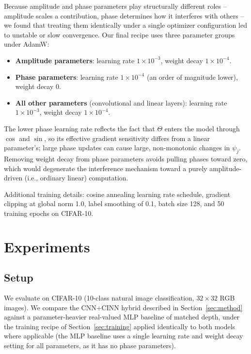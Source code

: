 \documentclass[11pt]{article}
\begin{document}
Because amplitude and phase parameters play structurally different roles -- amplitude scales a contribution, phase determines how it interferes with others -- we found that treating them identically under a single optimizer configuration led to unstable or slow convergence. Our final recipe uses three parameter groups under AdamW:

\begin{itemize}
    \item \textbf{Amplitude parameters}: learning rate $1\times10^{-3}$, weight decay $1\times10^{-4}$.
    \item \textbf{Phase parameters}: learning rate $1\times10^{-4}$ (an order of magnitude lower), weight decay $0$.
    \item \textbf{All other parameters} (convolutional and linear layers): learning rate $1\times10^{-3}$, weight decay $1\times10^{-4}$.
\end{itemize}

The lower phase learning rate reflects the fact that $\Theta$ enters the model through $\cos$ and $\sin$, so its effective gradient sensitivity differs from a linear parameter's; large phase updates can cause large, non-monotonic changes in $\psi_j$. Removing weight decay from phase parameters avoids pulling phases toward zero, which would degenerate the interference mechanism toward a purely amplitude-driven (i.e., ordinary linear) computation.

Additional training details: cosine annealing learning rate schedule, gradient clipping at global norm 1.0, label smoothing of 0.1, batch size 128, and 50 training epochs on CIFAR-10.

\section{Experiments}
\label{sec:experiments}

\subsection{Setup}
We evaluate on CIFAR-10 (10-class natural image classification, $32\times32$ RGB images). We compare the CNN+CINN hybrid described in Section~\ref{sec:method} against a parameter-heavier real-valued MLP baseline of matched depth, under the training recipe of Section~\ref{sec:training} applied identically to both models where applicable (the MLP baseline uses a single learning rate and weight decay setting for all parameters, as it has no phase parameters).
\end{document}
